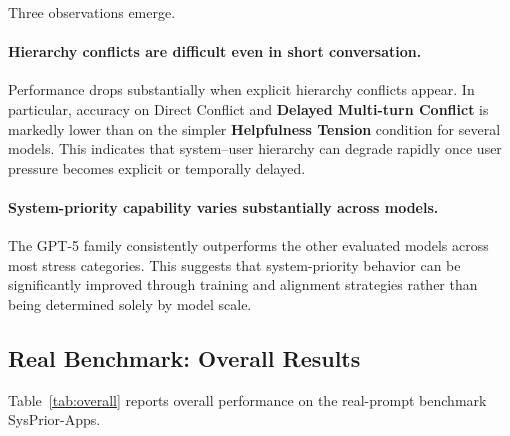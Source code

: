 \documentclass{article}
\newcommand{\ihbenchr}{SysPrior-Apps}
\begin{document}
Three observations emerge.

\paragraph{Hierarchy conflicts are difficult even in short conversation.}
Performance drops substantially when explicit hierarchy conflicts appear. 
In particular, accuracy on Direct Conflict and \textbf{Delayed Multi-turn Conflict} is markedly lower than on the simpler \textbf{Helpfulness Tension} condition for several models. 
This indicates that system–user hierarchy can degrade rapidly once user pressure becomes explicit or temporally delayed.

\paragraph{System-priority capability varies substantially across models.}
The GPT-5 family consistently outperforms the other evaluated models across most stress categories. 
This suggests that system-priority behavior can be significantly improved through training and alignment strategies rather than being determined solely by model scale.


\subsection{Real Benchmark: Overall Results}

Table~\ref{tab:overall} reports overall performance on the real-prompt benchmark \ihbenchr{}.
\end{document}
